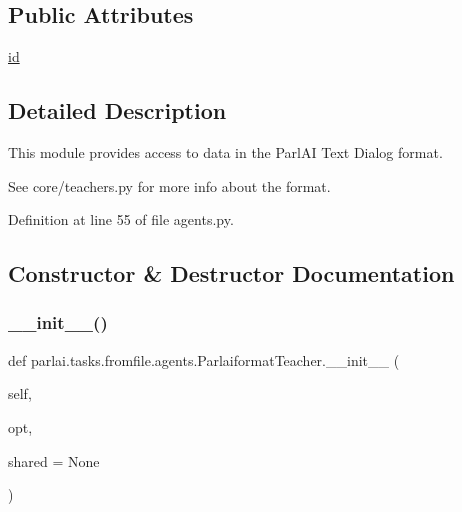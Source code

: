 \subsection*{Public Attributes}
\begin{DoxyCompactItemize}
\item 
\hyperlink{classparlai_1_1tasks_1_1fromfile_1_1agents_1_1ParlaiformatTeacher_af21d1457ab02cd0d2d0583d1c543004f}{id}
\end{DoxyCompactItemize}


\subsection{Detailed Description}
\begin{DoxyVerb}This module provides access to data in the ParlAI Text Dialog format.

See core/teachers.py for more info about the format.
\end{DoxyVerb}
 

Definition at line 55 of file agents.\+py.



\subsection{Constructor \& Destructor Documentation}
\mbox{\label{classparlai_1_1tasks_1_1fromfile_1_1agents_1_1ParlaiformatTeacher_a8d12f43b6359996764d176ba9a21189c}} 
\subsubsection{\texorpdfstring{\+\_\+\+\_\+init\+\_\+\+\_\+()}{\_\_init\_\_()}}
{\footnotesize\ttfamily def parlai.\+tasks.\+fromfile.\+agents.\+Parlaiformat\+Teacher.\+\_\+\+\_\+init\+\_\+\+\_\+ (\begin{DoxyParamCaption}\item[{}]{self,  }\item[{}]{opt,  }\item[{}]{shared = {\ttfamily None} }\end{DoxyParamCaption})}



